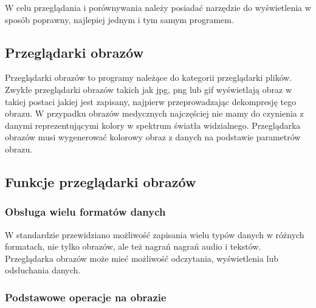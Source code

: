 
\par
W celu przeglądania i porównywania należy posiadać narzędzie do wyświetlenia w sposób poprawny, najlepiej jednym i tym samym programem.

\subsection{Przeglądarki obrazów}

Przeglądarki obrazów to programy należące do kategorii przeglądarki plików.
Zwykłe przeglądarki obrazów takich jak jpg, png lub gif wyświetlają obraz w takiej postaci jakiej jest zapisany, najpierw przeprowadzając dekompresję tego obrazu.
W przypadku obrazów medycznych najczęściej nie mamy do czynienia z danymi reprezentującymi kolory w spektrum światła widzialnego.
Przeglądarka obrazów \DICOM musi wygenerować kolorowy obraz z danych na podstawie parametrów obrazu.

\subsection{Funkcje przeglądarki obrazów}

\subsubsection{Obsługa wielu formatów danych}

W standardzie \DICOM przewidziano możliwość zapisania wielu typów danych w różnych formatach, nie tylko obrazów, ale też nagrań nagrań audio i tekstów.
Przeglądarka obrazów \DICOM może mieć możliwość odczytania, wyświetlenia lub odsłuchania danych.

\subsubsection{Podstawowe operacje na obrazie}

